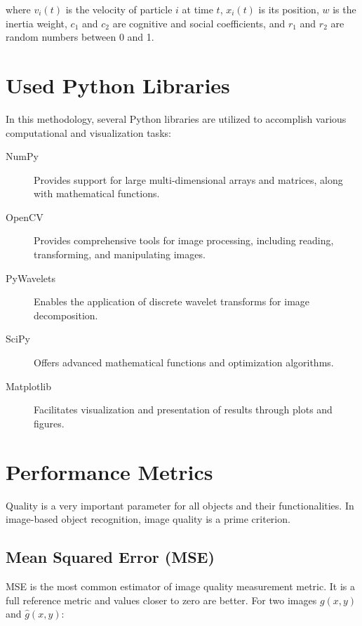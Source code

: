 where $v_i(t)$ is the velocity of particle $i$ at time $t$, $x_i(t)$ is its position, $w$ is the inertia weight, $c_1$ and $c_2$ are cognitive and social coefficients, and $r_1$ and $r_2$ are random numbers between 0 and 1.

\section{Used Python Libraries}

In this methodology, several Python libraries are utilized to accomplish various computational and visualization tasks:

\begin{description}
    \item[NumPy] Provides support for large multi-dimensional arrays and matrices, along with mathematical functions.
    
    \item[OpenCV] Provides comprehensive tools for image processing, including reading, transforming, and manipulating images.
    
    \item[PyWavelets] Enables the application of discrete wavelet transforms for image decomposition.
    
    \item[SciPy] Offers advanced mathematical functions and optimization algorithms.
    
    \item[Matplotlib] Facilitates visualization and presentation of results through plots and figures.
\end{description}

\section{Performance Metrics}

Quality is a very important parameter for all objects and their functionalities. In image-based object recognition, image quality is a prime criterion.

\subsection{Mean Squared Error (MSE)}

MSE is the most common estimator of image quality measurement metric. It is a full reference metric and values closer to zero are better. For two images $g(x,y)$ and $\hat{g}(x,y)$:

